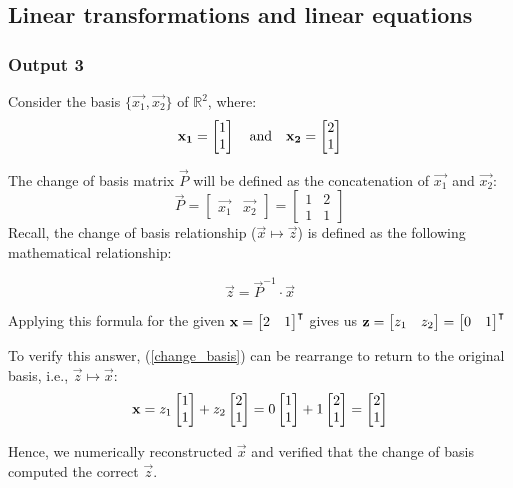 \documentclass[10pt]{article}
\begin{document}
\subsection{Linear transformations and linear equations}
\subsubsection{Output 3}
Consider the basis $\{\vec{x_1}, \vec{x_2}\}$ of $\mathbb{R}^2$, where:
\begin{equation*}
    \mathbf{x_1} = \begin{bmatrix} 1\\1 \end{bmatrix}
    \quad
    \text{and}
    \quad
    \mathbf{x_2} = \begin{bmatrix} 2\\1 \end{bmatrix}
\end{equation*}

The change of basis matrix $\vec{P}$ will be defined as the concatenation of $\vec{x_1}$ and $\vec{x_2}$:
\begin{equation*}
    \vec{P} =
        \begin{bmatrix}
            \vec{x_1} & \vec{x_2}
        \end{bmatrix} = 
        \begin{bmatrix}
            1 & 2\\1 & 1
        \end{bmatrix}
\end{equation*}
Recall, the change of basis relationship ($\vec{x} \mapsto \vec{z} $)  is defined as the following mathematical relationship:

\begin{equation} \label{change_basis}
    \vec{z} = \vec{P}^{-1} \cdot \vec{x}
\end{equation}

Applying this formula for the given $\mathbf{x} = \begin{bmatrix} 2&1 \end{bmatrix}^\intercal$ gives us $\mathbf{z} = \begin{bmatrix} z_1 & z_2 \end{bmatrix} = \begin{bmatrix} 0 & 1 \end{bmatrix}^\intercal$

To verify this answer, (\ref{change_basis}) can be rearrange to return to the original basis, i.e., $\vec{z} \mapsto \vec{x} $:
\begin{equation*}
    \mathbf{x} = z_1\begin{bmatrix} 1\\1 \end{bmatrix} + z_2\begin{bmatrix} 2\\1 \end{bmatrix} = 0\begin{bmatrix} 1\\1 \end{bmatrix} + 1\begin{bmatrix} 2\\1 \end{bmatrix} = \begin{bmatrix} 2\\1 \end{bmatrix}
\end{equation*}

Hence, we numerically reconstructed $\vec{x}$ and verified that the change of basis computed the correct $\vec{z}$.
\end{document}
